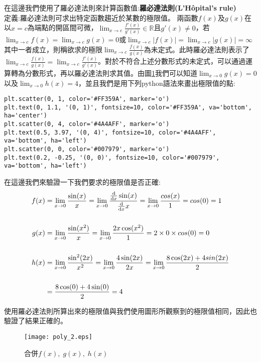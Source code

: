 \documentclass[12pt, a4paper]{article}
\begin{document}
在這邊我們使用了羅必達法則來計算函數值\;:\textbf{羅必達法則(L'Hôpital's rule)}\\
定義\;:\;羅必達法則可求出特定函數趨近於某數的極限值。
兩函數\;$f(x)$\;及\;$g(x)$\;在以\;$x=c$\;為端點的開區間可微，\;$\lim_{x\rightarrow c} \frac{f'(x)}{g'(x)} \in \mathbb{R}$\;且\;$g'(x)\neq 0$\;，若\;$\lim_{x\rightarrow c} f(x)=\lim_{x\rightarrow c} g(x)=0$\;或\;$\lim_{x\rightarrow c} \lvert f(x) \rvert=\lim_{x\rightarrow c} \lvert g(x) \rvert=\infty$\;其中一者成立，則稱欲求的極限\;$\lim_{x\rightarrow c} \frac{f(x)}{g(x)}$\;為未定式。此時羅必達法則表示了\;$\lim_{x\rightarrow c} \frac{f(x)}{g(x)}=\lim_{x\rightarrow c} \frac{f'(x)}{g'(x)}$\;。對於不符合上述分數形式的未定式，可以通過運算轉為分數形式，再以羅必達法則求其值。由圖\;\ref{fig:poly_2.eps}\;我們可以知道\;$ \lim_{x\rightarrow 0} g(x) = 0$\;以及\;$ \lim_{x\rightarrow 0} h(x) = 4$，並且我們是用下列python語法來畫出極限值的點\;:
\begin{lstlisting}
plt.scatter(0, 1, color='#FF359A', marker='o')
plt.text(0, 1.1, '(0, 1)', fontsize=10, color='#FF359A', va='bottom', ha='center')
plt.scatter(0, 4, color='#4A4AFF', marker='o')
plt.text(0.5, 3.97, '(0, 4)', fontsize=10, color='#4A4AFF', va='bottom', ha='left')
plt.scatter(0, 0, color='#007979', marker='o')
plt.text(0.2, -0.25, '(0, 0)', fontsize=10, color='#007979', va='bottom', ha='left')
\end{lstlisting}
在這邊我們來驗證一下我們要求的極限值是否正確\;:
\begin{align}
f(x)&=\lim_{x\rightarrow 0}\frac{\sin(x)}{x}=\lim_{x\rightarrow 0}\frac{\frac{\text{d}}{\text{d}x}\sin(x)}{\frac{\text{d}}{\text{d}x}x}=\lim_{x\rightarrow 0}\frac{cos(x)}{1}=cos(0)=1
\\\notag
\\
g(x)&= \lim_{x\rightarrow 0}\frac{\sin(x^2)}{x}=\lim_{x\rightarrow 0}\frac{2x\cos(x^2)}{1}=2\times 0\times cos(0)=0
\\\notag
\\
h(x)&=\lim_{x\rightarrow 0}\frac{\sin^2(2x)}{x^2}=\lim_{x\rightarrow 0}\frac{4\sin(2x)}{2x}=\lim_{x\rightarrow 0}\frac{8\cos(2x)+4sin(2x)}{2}\\\notag\\\notag&=\frac{8\cos(0)+4\sin(0)}{2}=4
\end{align}

使用羅必達法則所算出來的極限值與我們使用圖形所觀察到的極限值相同，因此也驗證了結果正確的。

\begin{figure}[h]
\centering
\texttt{[image: poly\_2.eps]}
\caption{合併$f(x),\;g(x),\;h(x)$}
\label{fig:poly_2.eps}
\end{figure}
\end{document}
